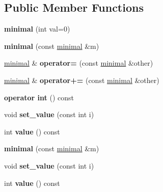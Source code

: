 \subsection*{Public Member Functions}
\begin{DoxyCompactItemize}
\item 
\hypertarget{classminimal_a0265cb91f6bcd2afbee4ecacf57689fc}{}{\bfseries minimal} (int val=0)\label{classminimal_a0265cb91f6bcd2afbee4ecacf57689fc}

\item 
\hypertarget{classminimal_a14e68c61caed7420f828b58cf56692fd}{}{\bfseries minimal} (const \hyperlink{classminimal}{minimal} \&m)\label{classminimal_a14e68c61caed7420f828b58cf56692fd}

\item 
\hypertarget{classminimal_aa90a0b3b29e35a2405e873c193465730}{}\hyperlink{classminimal}{minimal} \& {\bfseries operator=} (const \hyperlink{classminimal}{minimal} \&other)\label{classminimal_aa90a0b3b29e35a2405e873c193465730}

\item 
\hypertarget{classminimal_a2af4c2133613fca0a9213721495fdff1}{}\hyperlink{classminimal}{minimal} \& {\bfseries operator+=} (const \hyperlink{classminimal}{minimal} \&other)\label{classminimal_a2af4c2133613fca0a9213721495fdff1}

\item 
\hypertarget{classminimal_a64dc17d1cf547b7361bed7157aff1559}{}{\bfseries operator int} () const \label{classminimal_a64dc17d1cf547b7361bed7157aff1559}

\item 
\hypertarget{classminimal_ae388885c72e2c82e9a8f53e5a9f7571a}{}void {\bfseries set\+\_\+value} (const int i)\label{classminimal_ae388885c72e2c82e9a8f53e5a9f7571a}

\item 
\hypertarget{classminimal_a1a659db9a9b368c9e17593fddae6afec}{}int {\bfseries value} () const \label{classminimal_a1a659db9a9b368c9e17593fddae6afec}

\item 
\hypertarget{classminimal_a14e68c61caed7420f828b58cf56692fd}{}{\bfseries minimal} (const \hyperlink{classminimal}{minimal} \&m)\label{classminimal_a14e68c61caed7420f828b58cf56692fd}

\item 
\hypertarget{classminimal_ae388885c72e2c82e9a8f53e5a9f7571a}{}void {\bfseries set\+\_\+value} (const int i)\label{classminimal_ae388885c72e2c82e9a8f53e5a9f7571a}

\item 
\hypertarget{classminimal_a1a659db9a9b368c9e17593fddae6afec}{}int {\bfseries value} () const \label{classminimal_a1a659db9a9b368c9e17593fddae6afec}

\end{DoxyCompactItemize}


